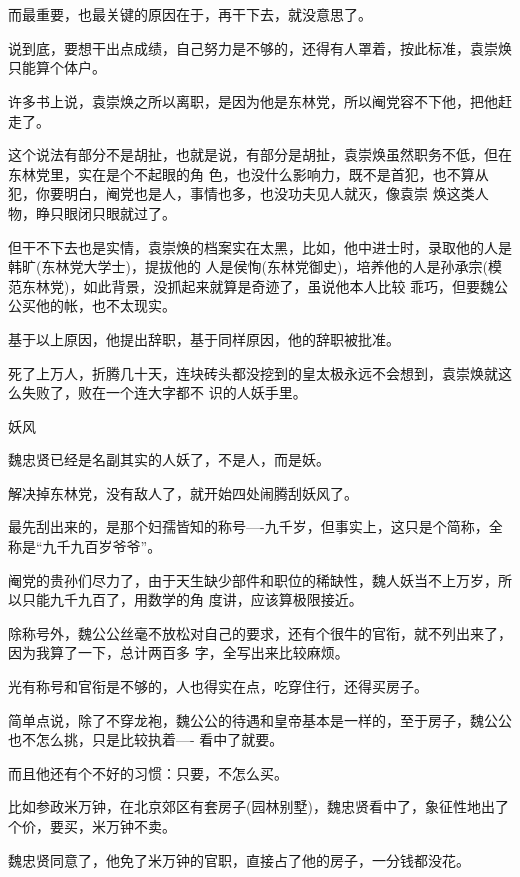 \documentclass[11pt,a4paper,onecolumn]{article}
\begin{document}
\section[\thesection]{}

而最重要，也最关键的原因在于，再干下去，就没意思了。

说到底，要想干出点成绩，自己努力是不够的，还得有人罩着，按此标准，袁崇焕只能算个体户。

许多书上说，袁崇焕之所以离职，是因为他是东林党，所以阉党容不下他，把他赶走了。

这个说法有部分不是胡扯，也就是说，有部分是胡扯，袁崇焕虽然职务不低，但在东林党里，实在是个不起眼的角
色，也没什么影响力，既不是首犯，也不算从犯，你要明白，阉党也是人，事情也多，也没功夫见人就灭，像袁崇
焕这类人物，睁只眼闭只眼就过了。

但干不下去也是实情，袁崇焕的档案实在太黑，比如，他中进士时，录取他的人是韩旷(东林党大学士)，提拔他的
人是侯恂(东林党御史)，培养他的人是孙承宗(模范东林党)，如此背景，没抓起来就算是奇迹了，虽说他本人比较
乖巧，但要魏公公买他的帐，也不太现实。

基于以上原因，他提出辞职，基于同样原因，他的辞职被批准。

死了上万人，折腾几十天，连块砖头都没挖到的皇太极永远不会想到，袁崇焕就这么失败了，败在一个连大字都不
识的人妖手里。

妖风

魏忠贤已经是名副其实的人妖了，不是人，而是妖。

解决掉东林党，没有敌人了，就开始四处闹腾刮妖风了。

最先刮出来的，是那个妇孺皆知的称号----九千岁，但事实上，这只是个简称，全称是``九千九百岁爷爷''。

阉党的贵孙们尽力了，由于天生缺少部件和职位的稀缺性，魏人妖当不上万岁，所以只能九千九百了，用数学的角
度讲，应该算极限接近。

除称号外，魏公公丝毫不放松对自己的要求，还有个很牛的官衔，就不列出来了，因为我算了一下，总计两百多
字，全写出来比较麻烦。

光有称号和官衔是不够的，人也得实在点，吃穿住行，还得买房子。

简单点说，除了不穿龙袍，魏公公的待遇和皇帝基本是一样的，至于房子，魏公公也不怎么挑，只是比较执着----
看中了就要。

而且他还有个不好的习惯：只要，不怎么买。

比如参政米万钟，在北京郊区有套房子(园林别墅)，魏忠贤看中了，象征性地出了个价，要买，米万钟不卖。

魏忠贤同意了，他免了米万钟的官职，直接占了他的房子，一分钱都没花。
\end{document}
